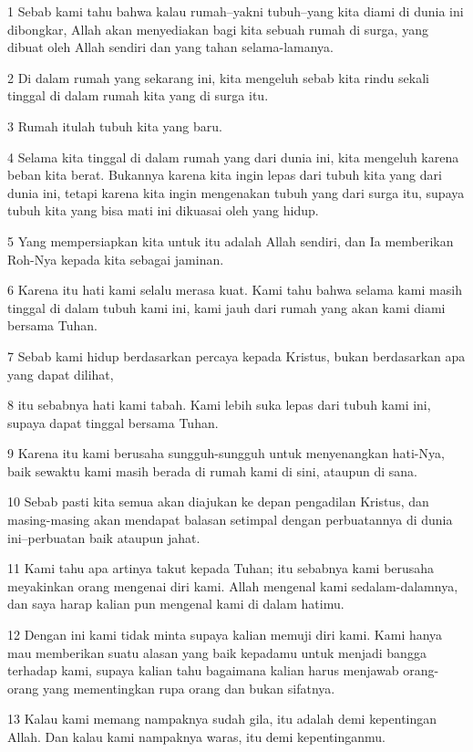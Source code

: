\par 1 Sebab kami tahu bahwa kalau rumah--yakni tubuh--yang kita diami di dunia ini dibongkar, Allah akan menyediakan bagi kita sebuah rumah di surga, yang dibuat oleh Allah sendiri dan yang tahan selama-lamanya.
\par 2 Di dalam rumah yang sekarang ini, kita mengeluh sebab kita rindu sekali tinggal di dalam rumah kita yang di surga itu.
\par 3 Rumah itulah tubuh kita yang baru.
\par 4 Selama kita tinggal di dalam rumah yang dari dunia ini, kita mengeluh karena beban kita berat. Bukannya karena kita ingin lepas dari tubuh kita yang dari dunia ini, tetapi karena kita ingin mengenakan tubuh yang dari surga itu, supaya tubuh kita yang bisa mati ini dikuasai oleh yang hidup.
\par 5 Yang mempersiapkan kita untuk itu adalah Allah sendiri, dan Ia memberikan Roh-Nya kepada kita sebagai jaminan.
\par 6 Karena itu hati kami selalu merasa kuat. Kami tahu bahwa selama kami masih tinggal di dalam tubuh kami ini, kami jauh dari rumah yang akan kami diami bersama Tuhan.
\par 7 Sebab kami hidup berdasarkan percaya kepada Kristus, bukan berdasarkan apa yang dapat dilihat,
\par 8 itu sebabnya hati kami tabah. Kami lebih suka lepas dari tubuh kami ini, supaya dapat tinggal bersama Tuhan.
\par 9 Karena itu kami berusaha sungguh-sungguh untuk menyenangkan hati-Nya, baik sewaktu kami masih berada di rumah kami di sini, ataupun di sana.
\par 10 Sebab pasti kita semua akan diajukan ke depan pengadilan Kristus, dan masing-masing akan mendapat balasan setimpal dengan perbuatannya di dunia ini--perbuatan baik ataupun jahat.
\par 11 Kami tahu apa artinya takut kepada Tuhan; itu sebabnya kami berusaha meyakinkan orang mengenai diri kami. Allah mengenal kami sedalam-dalamnya, dan saya harap kalian pun mengenal kami di dalam hatimu.
\par 12 Dengan ini kami tidak minta supaya kalian memuji diri kami. Kami hanya mau memberikan suatu alasan yang baik kepadamu untuk menjadi bangga terhadap kami, supaya kalian tahu bagaimana kalian harus menjawab orang-orang yang mementingkan rupa orang dan bukan sifatnya.
\par 13 Kalau kami memang nampaknya sudah gila, itu adalah demi kepentingan Allah. Dan kalau kami nampaknya waras, itu demi kepentinganmu.
